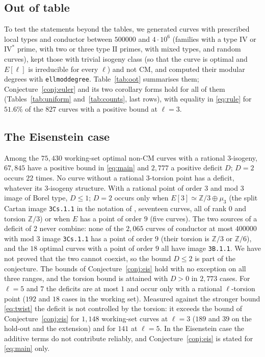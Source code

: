 \documentclass[11pt]{amsart}
\theoremstyle{definition}
\newcommand{\Z}{\mathbb{Z}}
\begin{document}
\subsection{Out of table}\label{sec:oot}
To test the statements beyond the tables, we generated curves with prescribed local types and conductor between $500000$ and $4\cdot10^6$ (families with a type $\mathrm{IV}$ or $\mathrm{IV}^*$ prime, with two or three type $\mathrm{II}$ primes, with mixed types, and random curves), kept those with trivial isogeny class (so that the curve is optimal and $E[\ell]$ is irreducible for every $\ell$) and not CM, and computed their modular degrees with \texttt{ellmoddegree}. Table~\ref{tab:oot} summarises them; Conjecture~\ref{conj:euler} and its two corollary forms hold for all of them (Tables~\ref{tab:uniform} and~\ref{tab:counts}, last rows), with equality in \eqref{eq:rule} for $51.6\%$ of the $827$ curves with a positive bound at $\ell=3$.

\begin{table}[ht]
\centering\small

\caption{Curves outside the tables, with modular degrees computed independently.}\label{tab:oot}
\end{table}

\subsection{The Eisenstein case}\label{sec:eis}
Among the $75{,}430$ working-set optimal non-CM curves with a rational $3$-isogeny, $67{,}845$ have a positive bound in \eqref{eq:main} and $2{,}777$ a positive deficit $D$; $D=2$ occurs $22$ times. No curve without a rational $3$-torsion point has a deficit, whatever its $3$-isogeny structure. With a rational point of order $3$ and mod $3$ image of Borel type, $D\le1$; $D=2$ occurs only when $E[3]\simeq\Z/3\oplus\mu_3$ (the split Cartan image \texttt{3Cs.1.1} in the notation of \cite{Sutherland16}, seventeen curves, all of rank $0$ and torsion $\Z/3$) or when $E$ has a point of order $9$ (five curves). The two sources of a deficit of $2$ never combine: none of the $2{,}065$ curves of conductor at most $400000$ with mod $3$ image \texttt{3Cs.1.1} has a point of order $9$ (their torsion is $\Z/3$ or $\Z/6$), and the $18$ optimal curves with a point of order $9$ all have image \texttt{3B.1.1}. We have not proved that the two cannot coexist, so the bound $D\le2$ is part of the conjecture. The bounds of Conjecture~\ref{conj:eis} hold with no exception on all three ranges, and the torsion bound is attained with $D>0$ in $2{,}773$ cases. For $\ell=5$ and $7$ the deficits are at most $1$ and occur only with a rational $\ell$-torsion point ($192$ and $18$ cases in the working set). Measured against the stronger bound \eqref{eq:twist} the deficit is not controlled by the torsion: it exceeds the bound of Conjecture~\ref{conj:eis} for $1{,}148$ working-set curves at $\ell=3$ ($189$ and $39$ on the hold-out and the extension) and for $141$ at $\ell=5$. In the Eisenstein case the additive terms do not contribute reliably, and Conjecture~\ref{conj:eis} is stated for \eqref{eq:main} only.
\end{document}
